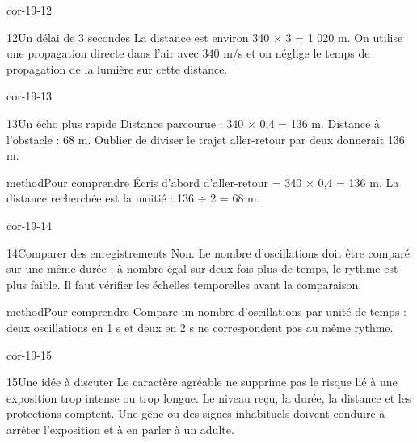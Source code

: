 \documentclass[12pt,twoside,openany]{book}
\begin{document}
\begin{blocLivre}{cor-19-12}
\begin{corrige}{12}{Un délai de 3 secondes}
La distance est environ 340 \(\times\) 3 = 1 020 m. On utilise une propagation directe dans l’air avec 340 m/s et on néglige le temps de propagation de la lumière sur cette distance.\par
\end{corrige}\end{blocLivre}
\begin{blocLivre}{cor-19-13}
\begin{corrige}{13}{Un écho plus rapide}
Distance parcourue : 340 \(\times\) 0,4 = 136 m. Distance à l’obstacle : 68 m. Oublier de diviser le trajet aller-retour par deux donnerait 136 m.\par
\begin{pcEncadre}{method}{Pour comprendre}
Écris d’abord d’aller-retour = 340 \(\times\) 0,4 = 136 m. La distance recherchée est la moitié : 136 \(\div\) 2 = 68 m.\par
\end{pcEncadre}
\end{corrige}\end{blocLivre}
\begin{blocLivre}{cor-19-14}
\begin{corrige}{14}{Comparer des enregistrements}
Non. Le nombre d’oscillations doit être comparé sur une même durée ; à nombre égal sur deux fois plus de temps, le rythme est plus faible. Il faut vérifier les échelles temporelles avant la comparaison.\par
\begin{pcEncadre}{method}{Pour comprendre}
Compare un nombre d’oscillations par unité de temps : deux oscillations en 1 s et deux en 2 s ne correspondent pas au même rythme.\par
\end{pcEncadre}
\end{corrige}\end{blocLivre}
\begin{blocLivre}{cor-19-15}
\begin{corrige}{15}{Une idée à discuter}
Le caractère agréable ne supprime pas le risque lié à une exposition trop intense ou trop longue. Le niveau reçu, la durée, la distance et les protections comptent. Une gêne ou des signes inhabituels doivent conduire à arrêter l’exposition et à en parler à un adulte.\par
\end{corrige}\end{blocLivre}
\end{document}
